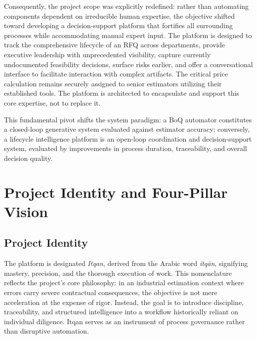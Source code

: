 Consequently, the project scope was explicitly redefined: rather than automating components dependent on irreducible human expertise, the objective shifted toward developing a decision-support platform that fortifies all surrounding processes while accommodating manual expert input. The platform is designed to track the comprehensive lifecycle of an RFQ across departments, provide executive leadership with unprecedented visibility, capture currently undocumented feasibility decisions, surface risks earlier, and offer a conversational interface to facilitate interaction with complex artifacts. The critical price calculation remains securely assigned to senior estimators utilizing their established tools. The platform is architected to encapsulate and support this core expertise, not to replace it.

This fundamental pivot shifts the system paradigm: a BoQ automator constitutes a closed-loop generative system evaluated against estimator accuracy; conversely, a lifecycle intelligence platform is an open-loop coordination and decision-support system, evaluated by improvements in process duration, traceability, and overall decision quality.

\section{Project Identity and Four-Pillar Vision}\label{sec:four_pillars}
\subsection{Project Identity}
The platform is designated \textit{Itqan}, derived from the Arabic word \textit{itq\={a}n}, signifying mastery, precision, and the thorough execution of work. This nomenclature reflects the project's core philosophy: in an industrial estimation context where errors carry severe contractual consequences, the objective is not mere acceleration at the expense of rigor. Instead, the goal is to introduce discipline, traceability, and structured intelligence into a workflow historically reliant on individual diligence. Itqan serves as an instrument of process governance rather than disruptive automation.

